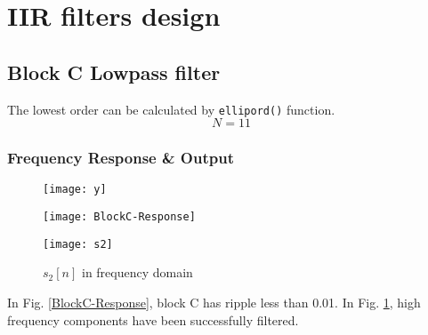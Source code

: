 \documentclass{article}
\newenvironment{homeworkProblem}[1]{
	\section{#1}
	}{
}
\newenvironment{homeworkSection}[1]{
	\subsection{#1}
	}{
}
\begin{document}
\begin{homeworkProblem}{IIR filters design}
\begin{homeworkSection}{Block C Lowpass filter}
The lowest order can be calculated by \texttt{ellipord()} function.
\begin{equation}
N = 11
\end{equation}


\subsubsection{Frequency Response \& Output}
\begin{figure}[H]
\begin{minipage}[t]{0.33\linewidth}
\centering
\texttt{[image: y]}
\caption{$\tilde{s}_2[n]$ multiplied by carrier}
\label{y}
\end{minipage}
\begin{minipage}[t]{0.33\linewidth}
\centering
\texttt{[image: BlockC-Response]}
\caption{Block C response}
\label{BlockC-Response}
\end{minipage}
\begin{minipage}[t]{0.33\linewidth}
\centering
\texttt{[image: s2]}
\caption{$s_2[n]$ in frequency domain}
\label{s2}
\end{minipage}
\end{figure}

In Fig. \ref{BlockC-Response}, block C has ripple less than 0.01. In Fig. \ref{s2}, high frequency components have been successfully filtered.

\end{homeworkSection}


\end{homeworkProblem}

\end{document}
